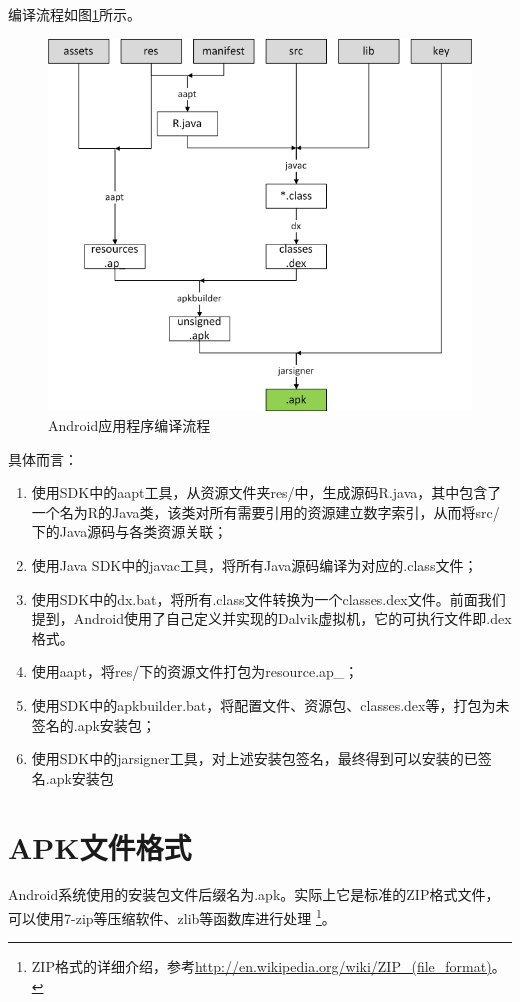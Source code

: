 编译流程如图\ref{Fig:compilation}所示。
\begin{figure}[htb]
  \centering
  \includegraphics[width=14cm]{image/compilation.jpg}
  \caption{Android应用程序编译流程}
  \label{Fig:compilation}
\end{figure}

具体而言：
\begin{enumerate}
	\item 使用SDK中的aapt工具，从资源文件夹res/中，生成源码R.java，其中包含了一个名为R的Java类，该类对所有需要引用的资源建立数字索引，从而将src/下的Java源码与各类资源关联；
	\item 使用Java SDK中的javac工具，将所有Java源码编译为对应的.class文件；
	\item 使用SDK中的dx.bat，将所有.class文件转换为一个classes.dex文件。前面我们提到，Android使用了自己定义并实现的Dalvik虚拟机，它的可执行文件即.dex格式。
	\item 使用aapt，将res/下的资源文件打包为resource.ap\_；
	\item 使用SDK中的apkbuilder.bat，将配置文件、资源包、classes.dex等，打包为未签名的.apk安装包；
	\item 使用SDK中的jarsigner工具，对上述安装包签名，最终得到可以安装的已签名.apk安装包
\end{enumerate}

\section{APK文件格式}
Android系统使用的安装包文件后缀名为.apk。实际上它是标准的ZIP格式文件，可以使用7-zip等压缩软件、zlib等函数库进行处理
\footnote{ZIP格式的详细介绍，参考\url{http://en.wikipedia.org/wiki/ZIP\_(file\_format)}。}。

